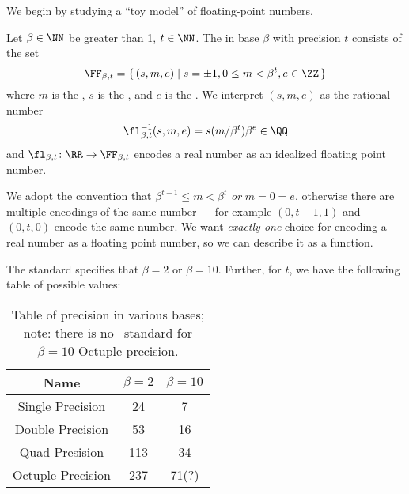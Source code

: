 We begin by studying a ``toy model'' of floating-point numbers.

\begin{defn}
  Let $\beta\in\NN$ be greater than 1, $t\in\NN$. The
   in base $\beta$ with precision $t$
  consists of the set
  \begin{equation}
    \FF_{\beta,t} = \{\, (s,m,e)\mid s=\pm1, 0\leq m<\beta^{t},e\in\ZZ\,\}
  \end{equation}
  where $m$ is the , $s$ is the , and $e$ is the
  . We interpret $(s,m,e)$ as the rational number
  \begin{equation}
    \fl^{-1}_{\beta,t}(s,m,e) = s(m/\beta^{t})\beta^{e}\in\QQ
  \end{equation}
  and $\fl_{\beta,t}\colon\RR\to\FF_{\beta,t}$ encodes a real number as an
  idealized floating point number.
\end{defn}

\begin{rmk}
We adopt the convention that $\beta^{t-1}\leq m<\beta^{t}$ \emph{or} $m=0=e$, otherwise there are
multiple encodings of the same number --- for example $(0,t-1,1)$ and
$(0,t,0)$ encode the same number. We want \emph{exactly one} choice for
encoding a real number as a floating point number, so we can describe it
as a function.
\end{rmk}

\begin{rmk}
  The  standard specifies that $\beta=2$ or $\beta=10$. Further,
  for $t$, we have the following table of possible values:
\begin{table}[h!]
  \centering
  \bgroup
  \def\arraystretch{1.125}
  \begin{tabular}{ |c|c|c| }
    \hline
 Name              & $\beta=2$ & $\beta=10$ \\ \hline
 Single Precision  & 24  & 7 \\
 Double Precision  & 53  & 16\\
 Quad Presision    & 113 & 34\\
 Octuple Precision & 237 & 71(?)\\
 \hline
\end{tabular}
  \egroup
\caption{Table of precision in various bases; note: there is no
  \ieee\ standard for $\beta=10$ Octuple precision.}
\end{table}
\end{rmk}


